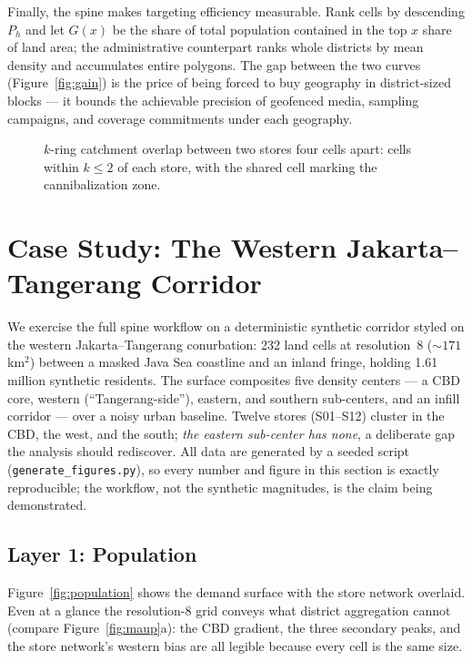 \documentclass[11pt,a4paper,twocolumn]{article}
\begin{document}
Finally, the spine makes targeting efficiency measurable. Rank cells by
descending $P_h$ and let $G(x)$ be the share of total population contained
in the top $x$ share of land area; the administrative counterpart ranks
whole districts by mean density and accumulates entire polygons. The gap
between the two curves (Figure~\ref{fig:gain}) is the price of being
forced to buy geography in district-sized blocks --- it bounds the
achievable precision of geofenced media, sampling campaigns, and coverage
commitments under each geography.

\begin{figure}[!tp]
  \centering
  \resizebox{\columnwidth}{!}{}
  \caption{$k$-ring catchment overlap between two stores four cells apart:
    cells within $k \le 2$ of each store, with the shared cell marking the
    cannibalization zone.}
  \label{fig:kring}
\end{figure}

\section{Case Study: The Western Jakarta--Tangerang Corridor}
\label{sec:casestudy}

We exercise the full spine workflow on a deterministic synthetic corridor
styled on the western Jakarta--Tangerang conurbation: 232 land cells at
resolution~8 (${\sim}171$\,km$^2$) between a masked Java Sea coastline and
an inland fringe, holding 1.61 million synthetic residents. The surface
composites five density centers --- a CBD core, western
(``Tangerang-side''), eastern, and southern sub-centers, and an infill
corridor --- over a noisy urban baseline. Twelve stores (S01--S12) cluster
in the CBD, the west, and the south; \emph{the eastern sub-center has
none}, a deliberate gap the analysis should rediscover. All data are
generated by a seeded script (\texttt{generate\_figures.py}), so every
number and figure in this section is exactly reproducible; the workflow,
not the synthetic magnitudes, is the claim being demonstrated.

\subsection{Layer 1: Population}

Figure~\ref{fig:population} shows the demand surface with the store
network overlaid. Even at a glance the resolution-8 grid conveys what
district aggregation cannot (compare Figure~\ref{fig:maup}a): the CBD
gradient, the three secondary peaks, and the store network's western bias
are all legible because every cell is the same size.
\end{document}
